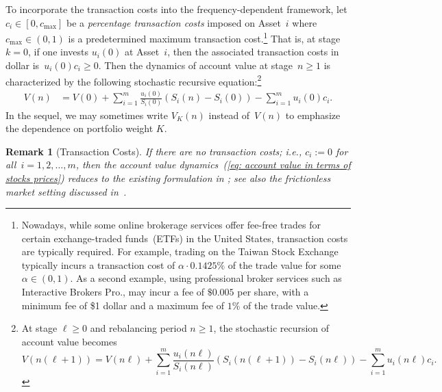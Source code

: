 \documentclass[10pt]{article} %
\newtheorem{remark}{Remark}[section]
\begin{document}
	
	
	
	To incorporate the transaction costs into the frequency-dependent framework, let $c_i \in [0, c_{\max}]$  be a \textit{percentage transaction costs} imposed on Asset~$i$ where $c_{\max} \in (0,1)$ is a predetermined maximum transaction cost.\footnote{Nowadays, while some online brokerage services offer fee-free trades  for certain exchange-traded funds~(ETFs) in the United States, transaction costs are typically required. 
		For example, trading on the Taiwan Stock Exchange typically incurs a transaction cost of $\alpha \cdot 0.1425\%$ of the trade value for some $\alpha \in (0,1)$. As a second example, using professional broker services such as Interactive Brokers Pro., may incur a fee of $\$0.005$ per share, with a minimum fee of \$1 dollar and a maximum fee of $1\%$ of the trade value. } 
	That is, at stage $k=0$, if one invests $u_i(0)$ at Asset~$i$, then the associated transaction costs in dollar is~$u_i(0) c_i \geq 0$.
	Then the dynamics of account value at stage~$n \geq 1$ is characterized by the following stochastic recursive equation:\footnote{At stage $\ell \geq 0$ and rebalancing period $n \geq 1$, the stochastic recursion of account value becomes
		$$
		V(n (\ell+1)) 
		= V(n \ell) + \sum_{i=1}^m \frac{u_i(n \ell)}{S_i(n \ell)} (S_i(n (\ell+1) ) - S_i(n \ell))- \sum_{i=1}^m u_i(n \ell)c_i.
		$$}
	\begin{align} \label{eq: account value in terms of stocks prices}
		V(n) 
		&= V(0) + \sum_{i=1}^m \frac{u_i(0)}{S_i(0)} (S_i(n) - S_i(0))- \sum_{i=1}^m u_i(0)c_i .
	\end{align}
	In the sequel, we may sometimes write $V_K(n)$ instead of~$V(n)$ to emphasize the dependence on portfolio weight $K$.
	
	
	\begin{remark}[Transaction Costs]\rm
		If there are no transaction costs; i.e., $c_i :=0$ for all~$i=1,2,\dots,m$, then the account value dynamics~(\ref{eq: account value in terms of stocks prices}) reduces to the existing formulation in \cite{rujeerapaiboon2018risk, hsieh2018rebalancing}; see also the frictionless market setting discussed in~\cite{merton1992continuous}.
	\end{remark}
	
	
\end{document}
